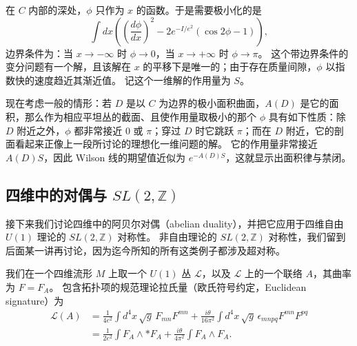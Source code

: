 
在 $C$ 内部的深处，$\phi$ 只作为 $x$ 的函数。于是需要极小化的是
\begin{equation}
  \tag{8.57}
  \label{eq:8-57}
  \int dx\left(\left(\frac{d\phi}{dx}\right)^{2}-2e^{-I/e^{2}}\left(\cos 2\phi-1\right)\right),
\end{equation}
边界条件为：当 $x\to-\infty$ 时 $\phi\to0$，当 $x\to+\infty$ 时 $\phi\to\pi$。
这个带边界条件的变分问题有一个解，且该解在 $x$ 的平移下是唯一的；由于存在质量间隙，$\phi$ 以指数快的速度趋近其渐近值。
记这个一维解的作用量为 $S$。


现在考虑一般的情形：若 $D$ 是以 $C$ 为边界的极小面积曲面，$A(D)$ 是它的面积，那么作为相应平坦丛的截面、且使作用量取极小的那个 $\phi$ 具有如下性质：除 $D$ 附近之外，$\phi$ 都非常接近 $0$ 或 $\pi$；穿过 $D$ 时它跳跃 $\pi$；而在 $D$ 附近，它的剖面看起来正像上一段所讨论的理想化一维问题的解。
它的作用量非常接近 $A(D)S$，因此 Wilson 线的期望值近似为 $e^{-A(D)S}$，这就显示出面积律与禁闭。

\subsection{四维中的对偶与 $SL(2,\mathbb{Z})$}

接下来我们讨论四维中的阿贝尔对偶（abelian duality），并把它应用于四维自由 $U(1)$ 理论的 $SL(2,\mathbb{Z})$ 对称性。
非自由理论的 $SL(2,\mathbb{Z})$ 对称性，我们留到后面某一讲再讨论，因为迄今所知的所有这类例子都涉及超对称。

我们在一个四维流形 $M$ 上取一个 $U(1)$ 丛 $\mathcal{L}$，以及 $\mathcal{L}$ 上的一个联络 $A$，其曲率为 $F=F_A$。
包含拓扑项的规范理论拉氏量（欧氏符号约定，Euclidean signature）为
\begin{equation}
  \tag{8.58}
  \label{eq:8-58}
  \begin{aligned}
  \mathcal{L}(A)&=\frac{1}{4e^{2}}\int d^{4}x\,\sqrt{g}\,F_{mn}F^{mn}+\frac{i\theta}{16\pi^{2}}\int d^{4}x\,\sqrt{g}\,\epsilon_{mnpq}F^{mn}F^{pq}\\
  &=\frac{1}{2e^{2}}\int F_{A}\wedge *F_{A}+\frac{i\theta}{4\pi^{2}}\int F_{A}\wedge F_{A}.
  \end{aligned}
\end{equation}

